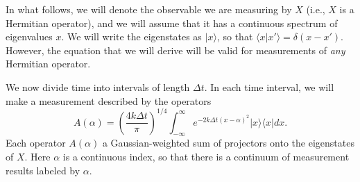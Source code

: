 \documentclass[12pt,aps,onecolum,superscriptaddress,footinbib,floatfix,showpacs]{revtex4-1}
\begin{document}
In what follows, we will denote the observable we are measuring by
$X$ (i.e., $X$ is a Hermitian operator), and 
we will assume that it has a continuous spectrum of eigenvalues
$x$. We will write the eigenstates as $|x\rangle$, so that
$\langle x|x'\rangle = \delta(x-x')$. However, the equation that
we will derive will be valid for measurements of \textit{any} Hermitian
operator.

We now divide time into intervals of length $\Delta t$. In each
time interval, we will make a measurement described by the
operators
\begin{equation}
A(\alpha) = \left( \frac{4k\Delta t}{\pi} \right)^{1/4} \int_{-\infty}^{\infty}
e^{-2k\Delta t(x-\alpha)^2} |x\rangle\langle x| dx .
  \label{xpovm}
\end{equation}
Each operator $A(\alpha)$ a Gaussian-weighted sum of projectors  
onto the eigenstates of $X$. 
Here $\alpha$ is a continuous 
index, so that there is a continuum of measurement results labeled by $\alpha$.
\end{document}
